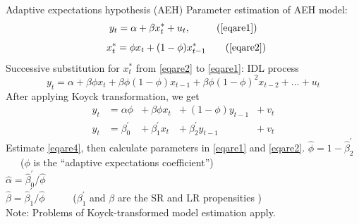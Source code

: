 \documentclass{beamer}
\begin{document}
\begin{frame}{Adaptive expectations hypothesis (AEH)}
Parameter estimation of AEH model:
\begin{equation}
y_t = \alpha + \beta x_t^\ast + u_t,~~ \tag{\ref{eqare1}}
\end{equation}
\begin{equation}
~~x_t^\ast =  \phi x_t + (1-\phi) x^\ast_{t-1} \tag{\ref{eqare2}}
\end{equation}
Successive substitution for $x_t^\ast$ from \eqref{eqare2} to \eqref{eqare1}: IDL process
\begin{equation}
y_t = \alpha + \beta \phi x_{t} 
    + \beta \phi (1-\phi)x_{t-1} + \beta \phi (1 - \phi)^2 x_{t-2} + \dots + u_t \label{eqare3}
 \end{equation}
After applying Koyck transformation, we get
\begin{equation} \label{eqare4}
\begin{aligned}
y_t &= \alpha \phi &+~ \beta \phi x_{t} &+~ (1-\phi) y_{t-1} &+~ v_t \\
y_t &= \beta_0^{\prime} &+~ \beta_1^{\prime} x_{t} &+~ \beta_2^{\prime} y_{t-1} &+~ v_t
\end{aligned}
\end{equation}
Estimate \eqref{eqare4}, then calculate parameters in \eqref{eqare1} and \eqref{eqare2}.
\smallskip
$\hat{\phi}= 1-\hat{\beta}_2^{\prime}$ ~~~($\phi$ is the ``adaptive expectations coefficient'')\\
\smallskip
$\hat{\alpha} =\hat{\beta}_0^{\prime}/\hat{\phi}$\\
\smallskip
$\hat{\beta} =\hat{\beta}_1^{\prime}/\hat{\phi}$ ~~~~~($\beta_1^{\prime}$ and $\beta$ are the SR and LR propensities )\\
\smallskip
\footnotesize{\qquad Note: Problems of Koyck-transformed model estimation apply.}
\end{frame}
\end{document}
